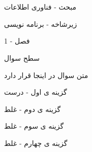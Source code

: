 \documentclass[12pt]{article}
\begin{document}
\section{}

مبحث - فناوری اطلاعات 

زیرشاخه - برنامه نویسی 

فصل - 1

سطح سوال

متن سوال در اینجا قرار دارد

گزینه ی اول - درست

گزینه ی دوم - غلط

گزینه ی سوم - غلط

گزینه ی چهارم - غلط
\end{document}
